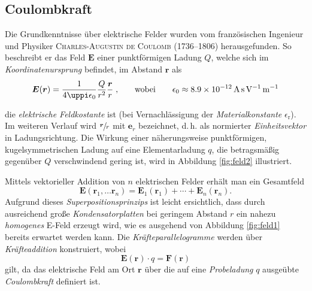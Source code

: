 \subsection{Coulombkraft}

Die Grundkenntnisse über elektrische Felder wurden vom französischen Ingenieur und Physiker \textsc{Charles-Augustin de Coulomb} (1736--1806) herausgefunden. So beschreibt er das Feld $\boldsymbol{E}$ einer punktförmigen Ladung $Q$, welche sich im \textit{Koordinatenursprung} befindet, im Abstand $\boldsymbol{r}$ als
\begin{equation}
\label{eq:coulomb1}
\boldsymbol{E}(\boldsymbol{r})=\frac{1}{4\uppi\epsilon_\mathrm{0}}\frac{Q}{r^2}\frac{\boldsymbol{r}}{r}\;\mathrm{,} \qquad \text{wobei}\qquad \epsilon_\mathrm{0} \approx \SI{8.9E-12}{\ampere\second\per\volt\per\metre}
\end{equation}

die \textit{elektrische Feldkostante} ist (bei Vernachlässigung der \textit{Materialkonstante} $\epsilon_{\mathrm{r}}$). Im weiteren Verlauf wird $\sfrac{\boldsymbol{r}}{r}$ mit $\boldsymbol{e}_r$ bezeichnet, d.\,h. als normierter \textit{Einheitsvektor} in Ladungsrichtung. Die Wirkung einer näherungsweise punktförmigen, kugelsymmetrischen Ladung auf eine Elementarladung $q$, die betragsmäßig gegenüber $Q$ verschwindend gering ist, wird in Abbildung \ref{fig:feld2} illustriert. \par
Mittels vektorieller Addition von $n$ elektrischen Felder erhält man ein Gesamtfeld
\begin{equation}
\label{eq:super1}
\boldsymbol{E}(\boldsymbol{r}_1,\dots \boldsymbol{r}_n)= \boldsymbol{E}_1(\boldsymbol{r}_1) + \cdots + \boldsymbol{E}_n(\boldsymbol{r}_n).
\end{equation}
Aufgrund dieses \textit{Superpositionsprinzips} ist leicht ersichtlich, dass durch ausreichend große \textit{Kondensatorplatten} bei geringem Abstand $r$ ein nahezu \textit{homogenes} E-Feld erzeugt wird, wie es ausgehend von Abbildung \ref{fig:feld1} bereits erwartet werden kann.  Die \textit{Kräfteparallelogramme} werden über \textit{Kräfteaddition} konstruiert, wobei 
\begin{equation}
\label{eq:kraft1}
\boldsymbol{E}(\boldsymbol{r})\cdot q = \boldsymbol{F}(\boldsymbol{r})
\end{equation} 
gilt, da das elektrische Feld am Ort $\boldsymbol{r}$ über die auf eine \textit{Probeladung} $q$ ausgeübte \textit{Coulombkraft} definiert ist.\vspace*{-2cm}\vspace*{2cm} 

